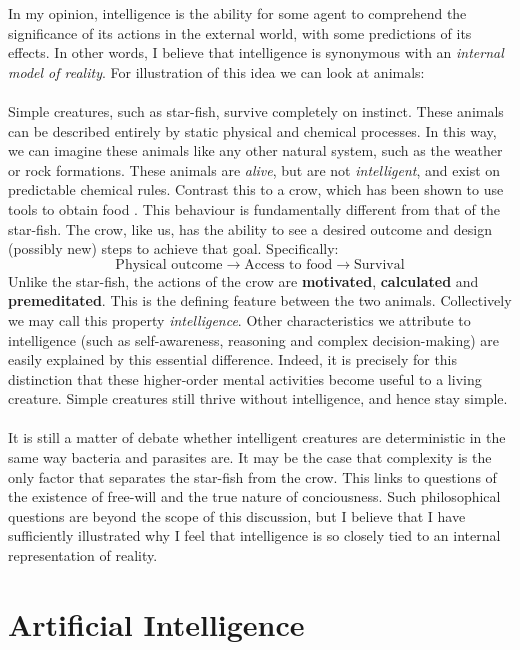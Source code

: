 \documentclass[10pt,a4paper]{article}
\begin{document}
				In my opinion, intelligence is the ability for some agent to comprehend the significance of its actions in the external world, with some predictions of its effects. In other words, I believe that intelligence is synonymous with an \textsl{internal model of reality}. For illustration of this idea we can look at animals:
				\\\\
				Simple creatures, such as star-fish, survive completely on instinct. These animals can be described entirely by static physical and chemical processes. In this way, we can imagine these animals like any other natural system, such as the weather or rock formations. These animals are \textsl{alive}, but are not \textsl{intelligent}, and exist on predictable chemical rules. Contrast this to a crow, which has been shown to use tools to obtain food \cites{atlantic2017}. This behaviour is fundamentally different from that of the star-fish. The crow, like us, has the ability to see a desired outcome and design (possibly new) steps to achieve that goal. Specifically:
				\medskip
				\[
				\text{Physical outcome}\rightarrow\text{Access to food}\rightarrow\text{Survival}
				\]
				Unlike the star-fish, the actions of the crow are \textbf{motivated}, \textbf{calculated} and \textbf{premeditated}. This is the defining feature between the two animals. Collectively we may call this property \textsl{intelligence}. Other characteristics we attribute to intelligence (such as self-awareness, reasoning and complex decision-making) are easily explained by this essential difference. Indeed, it is precisely for this distinction that these higher-order mental activities become useful to a living creature. Simple creatures still thrive without intelligence, and hence stay simple.
				\\\\
				It is still a matter of debate whether intelligent creatures are deterministic in the same way bacteria and parasites are. It may be the case that complexity is the only factor that separates the star-fish from the crow. This links to questions of the existence of free-will and the true nature of conciousness. Such philosophical questions are beyond the scope of this discussion, but I believe that I have sufficiently illustrated why I feel that intelligence is so closely tied to an internal representation of reality.
				
		
		\pagebreak
		\section{Artificial Intelligence}
\end{document}
